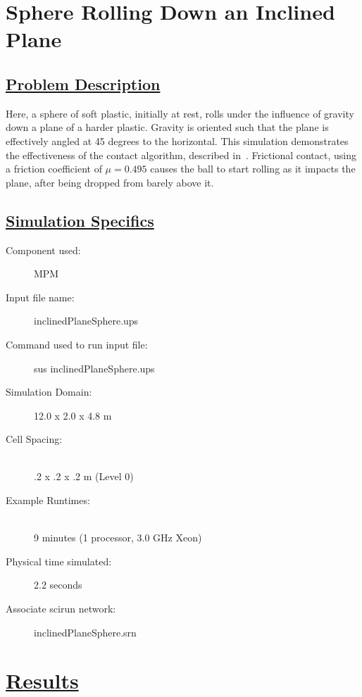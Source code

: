 \documentclass[fleqn]{article}
\begin{document}
\section*{\center Sphere Rolling Down an Inclined Plane}
\subsection*{\underline{Problem Description}}
Here, a sphere of soft plastic, initially at rest, rolls under the
influence of gravity down a plane of a harder plastic.  Gravity is
oriented such that the plane is effectively angled at 45 degrees to
the horizontal.  This simulation demonstrates the effectiveness of
the contact algorithm, described in~\cite{bard01}.  Frictional
contact, using a friction coefficient of $\mu = 0.495$ causes the ball
to start rolling as it impacts the plane, after being dropped from
barely above it.
 
\subsection*{\underline{Simulation Specifics}}
\begin{description} 
\item [Component used:] \hfill MPM
\item [Input file name:] \hfill inclinedPlaneSphere.ups
\item [Command used to run input file:]\hfill sus inclinedPlaneSphere.ups
\item [Simulation Domain:]\hfill    12.0 x 2.0 x 4.8 m

\item [Cell Spacing:]\hfill \\ 
.2 x .2 x .2 m (Level 0)

\item [Example Runtimes:] \hfill \\
 9 minutes  (1 processor, 3.0 GHz Xeon)\\

\item [Physical time simulated:] \hfill 2.2 seconds

\item [Associate scirun network:] \hfill inclinedPlaneSphere.srn

\end{description}

\section*{\underline{Results}}
\end{document}
